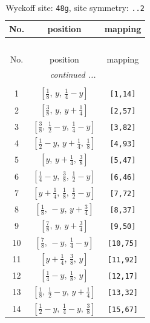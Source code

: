 \documentclass[fleqn,8pt]{jsarticle}
\begin{document}
\begin{longtable}{ccc}
\caption{Wyckoff site: {\tt 48g}, site symmetry: {\tt ..2}}
 \\
 \hline \hline
No. & position & mapping \\ \hline \endfirsthead

\multicolumn{2}{l}{\tablename\ \thetable{}} \\
 \hline \hline
No. & position & mapping \\ \hline \endhead

 \hline \hline
\multicolumn{2}{r}{\footnotesize\it continued ...} \\ \endfoot

 \hline \hline
\multicolumn{2}{r}{} \\ \endlastfoot

1 & $\left[ \frac{1}{8},\, y,\, \frac{1}{4} - y \right]$ & {\tt [1,14]} \\ \hline
2 & $\left[ \frac{3}{8},\, y,\, y + \frac{1}{4} \right]$ & {\tt [2,57]} \\ \hline
3 & $\left[ \frac{3}{8},\, \frac{1}{2} - y,\, \frac{1}{4} - y \right]$ & {\tt [3,82]} \\ \hline
4 & $\left[ \frac{1}{2} - y,\, y + \frac{1}{4},\, \frac{1}{8} \right]$ & {\tt [4,93]} \\ \hline
5 & $\left[ y,\, y + \frac{1}{4},\, \frac{3}{8} \right]$ & {\tt [5,47]} \\ \hline
6 & $\left[ \frac{1}{4} - y,\, \frac{3}{8},\, \frac{1}{2} - y \right]$ & {\tt [6,46]} \\ \hline
7 & $\left[ y + \frac{1}{4},\, \frac{1}{8},\, \frac{1}{2} - y \right]$ & {\tt [7,72]} \\ \hline
8 & $\left[ \frac{1}{8},\, - y,\, y + \frac{3}{4} \right]$ & {\tt [8,37]} \\ \hline
9 & $\left[ \frac{7}{8},\, y,\, y + \frac{3}{4} \right]$ & {\tt [9,50]} \\ \hline
10 & $\left[ \frac{7}{8},\, - y,\, \frac{1}{4} - y \right]$ & {\tt [10,75]} \\ \hline
11 & $\left[ y + \frac{1}{4},\, \frac{3}{8},\, y \right]$ & {\tt [11,92]} \\ \hline
12 & $\left[ \frac{1}{4} - y,\, \frac{1}{8},\, y \right]$ & {\tt [12,17]} \\ \hline
13 & $\left[ \frac{1}{8},\, \frac{1}{2} - y,\, y + \frac{1}{4} \right]$ & {\tt [13,32]} \\ \hline
14 & $\left[ \frac{1}{2} - y,\, \frac{1}{4} - y,\, \frac{3}{8} \right]$ & {\tt [15,67]} \\ \hline

\end{longtable}
\end{document}
